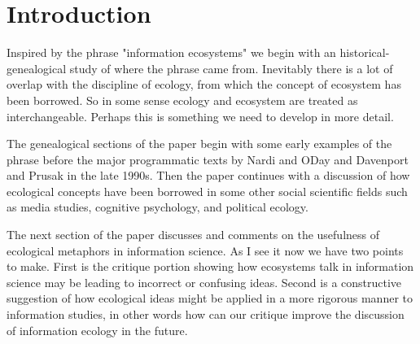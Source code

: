 \section{Introduction}

Inspired by the phrase "information ecosystems" we begin with an historical-genealogical study of where the phrase came from. Inevitably there is a lot of overlap with the discipline of ecology, from which the concept of ecosystem has been borrowed. So in some sense ecology and ecosystem are treated as interchangeable. Perhaps this is something we need to develop in more detail.

The genealogical sections of the paper begin with some early examples of the phrase before the major programmatic texts by Nardi and ODay and Davenport and Prusak in the late 1990s. Then the paper continues with a discussion of how ecological concepts have been borrowed in some other social scientific fields such as media studies, cognitive psychology, and political ecology.

The next section of the paper discusses and comments on the usefulness of ecological metaphors in information science. As I see it now we have two points to make. First is the critique portion showing how ecosystems talk in information science may be leading to incorrect or confusing ideas. Second is a constructive suggestion of how ecological ideas might be applied in a more rigorous manner to information studies, in other words how can our critique improve the discussion of information ecology in the future.